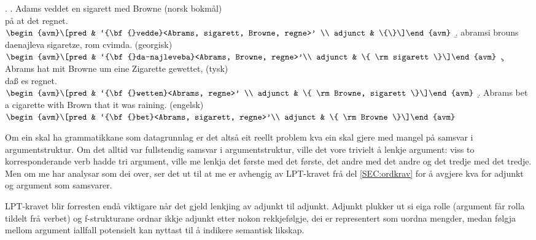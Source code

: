 \documentclass[12pt,a4paper,oneside,draft]{report}
\begin{document}
{\avmoptions{}
\ex. \label{ex:vedde}
\a. Adams veddet en sigarett med Browne \hfill{} (norsk bokmål)\\ på at det regnet.\\
    $\\\begin{avm}\[pred & `{\bf{}vedde}<Abrams, sigarett, Browne, regne>' \\
                 adjunct & \{\}\]\end{avm}\\$
\b. abramsi brouns daenajleva sigaretze, rom cvimda. \hfill{} (georgisk)\\
    $\\\begin{avm}\[pred &  `{\bf{}da-najleveba}<Abrams, Browne, regne>'\\
    adjunct &  \{ \rm sigarett \}\]\end{avm}\\$ 
\c. Abrams hat mit Browne um eine Zigarette gewettet, \hfill{}(tysk)\\
    daß es regnet.\\
    $\\\begin{avm}\[pred & `{\bf{}wetten}<Abrams, regne>' \\
                  adjunct & \{ \rm Browne, sigarett \}\]\end{avm}\\$
\d. Abrams bet a cigarette with Brown that it was raining. \hfill{}(engelsk)\\
    $\\\begin{avm}\[pred & `{\bf{}bet}<Abrams, sigarett, regne>'\\
                  adjunct & \{ \rm Browne \}\]\end{avm}$

}

Om ein skal ha grammatikkane som datagrunnlag er det altså eit reellt
problem kva ein skal gjere med mangel på samsvar i
argumentstruktur. Om det alltid var fullstendig samsvar i
argumentstruktur, ville det vore trivielt å lenkje argument: viss to
korresponderande verb hadde tri argument, ville me lenkja det første
med det første, det andre med det andre og det tredje med det
tredje. Men om me har analysar som dei over, ser det ut til at me er
avhengig av LPT-kravet frå del \ref{SEC:ordkrav} for å avgjere kva for
adjunkt og argument som samsvarer. 

LPT-kravet blir forresten endå viktigare når det gjeld lenkjing av
adjunkt til adjunkt. Adjunkt plukker ut si eiga rolle (argument får
rolla tildelt frå verbet) og f-strukturane ordnar ikkje adjunkt etter
nokon rekkjefølgje, dei er representert som uordna mengder, medan
følgja mellom argument iallfall potensielt kan nyttast til å indikere
semantisk likskap.
\end{document}
